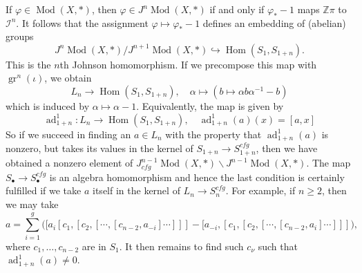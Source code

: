 \documentclass[12pt,letterpaper]{amsart}
\numberwithin{equation}{section}
\def\ZZ{{\mathbb Z}}
\def\ssm{\smallsetminus}
\def\Ical{{\mathcal I}}
\def\pt{{\scriptscriptstyle\bullet}}
\newcommand\ad{\operatorname{ad}}
\newcommand\cfg{\mathit{cfg}}
\newcommand\gr{\operatorname{gr}}
\newcommand\Hom{\operatorname{Hom}}
\newcommand\Mod{\operatorname{Mod}}
\theoremstyle{remark}
\begin{document}
If $\varphi\in \Mod(X,*)$, then  $\varphi\in J^n\Mod(X,*)$ if and only if $\varphi_*-1$ maps $\ZZ\pi$ to $\Ical^n$. It follows that the assignment  $\varphi\mapsto \varphi_*-1$   defines an embedding of (abelian) groups
\[
J^n\Mod(X,*)/J^{n+1}\Mod(X,*)\hookrightarrow \Hom(S_1, S_{1+n}).
\]
This is  the $n$th Johnson homomorphism. If we precompose this map with $\gr^n(\iota)$, we obtain 
\[
L_n\to \Hom(S_1, S_{1+n}), \quad \alpha\mapsto (b\mapsto \alpha b\alpha^{-1}-b)
\]
which is induced by $\alpha\mapsto \alpha-1$. Equivalently, the map is given by
\[
\ad^1_{1+n}: L_n\to \Hom(S_1, S_{1+n}), \quad \ad^1_{1+n}(a)(x)= [a,x]
\]
So if we succeed in finding an $a\in L_n$ with the property that $\ad^1_{1+n}(a)$ is nonzero, but takes its values in the kernel of 
$S_{1+n}\to S^\cfg_{1+n}$, then we have obtained a nonzero element of $J_\cfg^{n-1}\Mod(X,*)\ssm J^{n-1}\Mod(X,*)$.
The map $S_\pt\to  S^\cfg_\pt$ is an algebra homomorphism and hence the  last  condition is certainly fulfilled if we take  
$a$ itself in the kernel of  $L_n\to S^\cfg_n$. For example, if $n\ge 2$, then we may take 
\[
\textstyle a=\sum_{i=1}^g  \Big([a_i[c_1,[c_2,[\cdots , [c_{n-2},a_{-i}]\cdots]\!]\!] -[a_{-i},[c_1,[c_2,[\cdots , [c_{n-2},a_{i}]\cdots\!]\!]\!] \Big),
\]
where $c_1, \dots , c_{n-2}$ are in $S_1$. It then remains to find such $c_\nu$ such that $\ad^1_{1+n}(a)\not=0$. 
\end{document}
